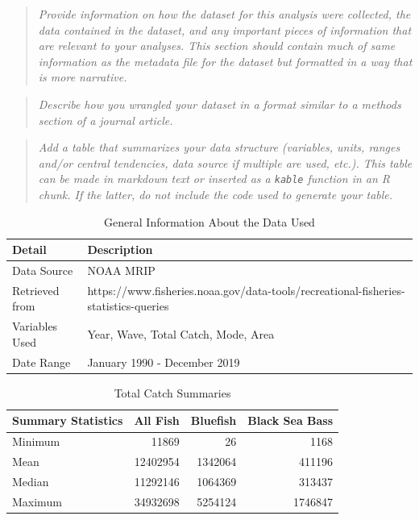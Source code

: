 \documentclass[
  12pt,
]{article}
\begin{document}
\begin{quote}
\emph{Provide information on how the dataset for this analysis were
collected, the data contained in the dataset, and any important pieces
of information that are relevant to your analyses. This section should
contain much of same information as the metadata file for the dataset
but formatted in a way that is more narrative.}
\end{quote}

\begin{quote}
\emph{Describe how you wrangled your dataset in a format similar to a
methods section of a journal article.}
\end{quote}

\begin{quote}
\emph{Add a table that summarizes your data structure (variables, units,
ranges and/or central tendencies, data source if multiple are used,
etc.). This table can be made in markdown text or inserted as a
\texttt{kable} function in an R chunk. If the latter, do not include the
code used to generate your table.}
\end{quote}

\begin{table}[H]

\caption{\label{tab:table1}General Information About the Data Used}
\centering
\begin{tabular}[t]{l|l}
\hline
Detail & Description\\
\hline
Data Source & NOAA MRIP\\
\hline
Retrieved from & https://www.fisheries.noaa.gov/data-tools/recreational-fisheries-statistics-queries\\
\hline
Variables Used & Year, Wave, Total Catch, Mode, Area\\
\hline
Date Range & January 1990 - December 2019\\
\hline
\end{tabular}
\end{table}

\begin{table}[H]

\caption{\label{tab:table2}Total Catch Summaries}
\centering
\begin{tabular}[t]{l|r|r|r}
\hline
Summary Statistics & All Fish & Bluefish & Black Sea Bass\\
\hline
Minimum & 11869 & 26 & 1168\\
\hline
Mean & 12402954 & 1342064 & 411196\\
\hline
Median & 11292146 & 1064369 & 313437\\
\hline
Maximum & 34932698 & 5254124 & 1746847\\
\hline
\end{tabular}
\end{table}
\newpage
\end{document}
